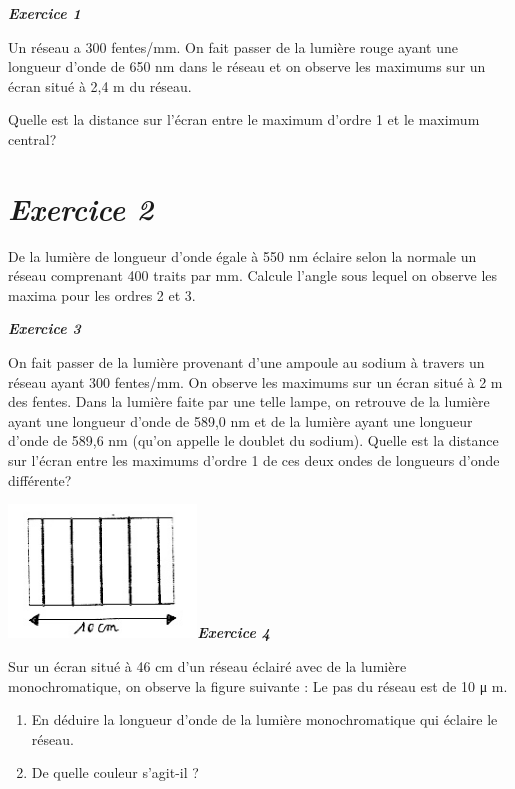 \emph{\textbf{Exercice 1}}

Un réseau a 300 fentes/mm. On fait passer de la lumière rouge ayant une
longueur d'onde de 650 nm dans le réseau et on observe les maximums sur
un écran situé à 2,4 m du réseau.

Quelle est la distance sur l'écran entre le maximum d'ordre 1 et le
maximum central?

\hypertarget{exercice-2-1}{%
\section{\texorpdfstring{\emph{Exercice
2}}{Exercice 2}}\label{exercice-2-1}}

De la lumière de longueur d'onde égale à 550 nm éclaire selon la normale
un réseau comprenant 400 traits par mm. Calcule l'angle sous lequel on
observe les maxima pour les ordres 2 et 3.

\emph{\textbf{Exercice 3}}

On fait passer de la lumière provenant d'une ampoule au sodium à travers
un réseau ayant 300 fentes/mm. On observe les maximums sur un écran
situé à 2 m des fentes. Dans la lumière faite par une telle lampe, on
retrouve de la lumière ayant une longueur d'onde de 589,0 nm et de la
lumière ayant une longueur d'onde de 589,6 nm (qu'on appelle le doublet
du sodium). Quelle est la distance sur l'écran entre les maximums
d'ordre 1 de ces deux ondes de longueurs d'onde différente?

\includegraphics[width=5.008cm,height=3.551cm]{Pictures/10000001000000C70000008D88834268E2E16F18.png}\emph{\textbf{Exercice
4}}

Sur un écran situé à 46 cm d'un réseau éclairé avec de la lumière
monochromatique, on observe la figure suivante : Le pas du réseau est de
10 μ m.

\begin{enumerate}
\def\labelenumi{\alph{enumi})}
\tightlist
\item
  En déduire la longueur d'onde de la lumière monochromatique qui
  éclaire le réseau.
\item
  De quelle couleur s'agit-il ?
\end{enumerate}

